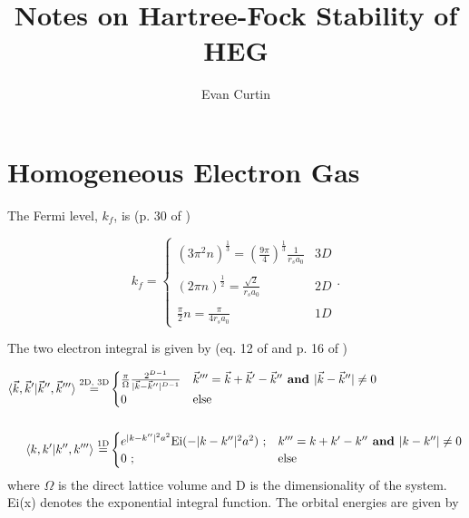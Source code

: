 \documentclass{revtex4}
\begin{document}
\title{Notes on Hartree-Fock Stability of HEG}
\author{Evan Curtin}
\maketitle


\section{Homogeneous Electron Gas}


The Fermi level, $k_f$, is (p. 30 of \cite{Guiliani2005})

\begin{equation}
k_f
=\begin{cases} 
      (3\pi^2n)^{\frac{1}{3}} = \left(\frac{9\pi}{4}\right)^{\frac{1}{3}}\frac{1}{r_sa_0} & 3D \\ \\
      (2\pi n)^{\frac{1}{2}} = \frac{\sqrt{2}}{r_sa_0}  & 2D \\
      \\
      \frac{\pi}{2}n = \frac{\pi}{4 r_s a_0}   & 1D 
   \end{cases}
   .
\end{equation}

The two electron integral is given by (eq. 12 of \cite{Delyon2008} and p. 16 of \cite{Guiliani2005})

\begin{subequations}
\begin{align}
\braket{\vec{k}, \vec{k}'|\vec{k}'',\vec{k}'''}\stackrel{\text{2D, 3D}}{=}&
	\begin{cases} 
	\frac{\pi}{\Omega}\frac{2^{D-1}}{|\vec{k}-\vec{k}''|^{D-1}} 
	& \vec{k}''' = \vec{k}+\vec{k}'-\vec{k}'' \textbf{ and } |\vec{k}-\vec{k}''| \neq 0 \\
	0 
	& \text{else}
	\end{cases}
\\ \nonumber \\
\braket{k, k'|k'',k'''}\stackrel{\text{1D}}{=}&
	\begin{cases} 
	e^{|k-k''|^2a^2}\text{Ei}(-|k-k''|^2a^2)\text{ ;}
	& k''' = k+k'-k'' \textbf{ and } |k-k''| \neq 0 \\
	0\text{ ;} 
	& \text{else}
	\end{cases}
\end{align}
\end{subequations}
where $\Omega$ is the direct lattice volume and D is the dimensionality of the system. Ei(x) denotes the exponential integral function. The orbital energies are given by 
\end{document}
